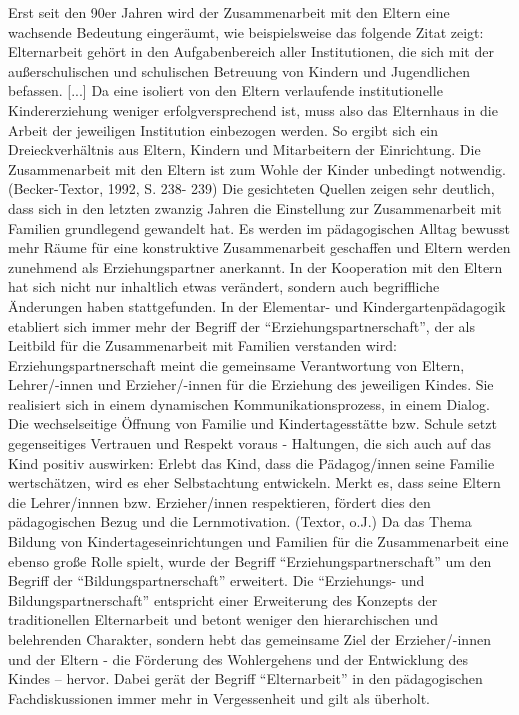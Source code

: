\documentclass[12pt,a4paper]{article}
\begin{document}
	Erst seit den 90er Jahren wird der Zusammenarbeit mit den Eltern eine wachsende Bedeutung eingeräumt, wie beispielsweise das folgende Zitat zeigt:
	Elternarbeit gehört in den Aufgabenbereich aller Institutionen, die 	sich mit der	außerschulischen und schulischen Betreuung von 		Kindern und Jugendlichen  befassen. [...] Da eine isoliert von den 	Eltern verlaufende institutionelle Kindererziehung weniger 	erfolgversprechend ist, muss also das Elternhaus in die Arbeit 	der jeweiligen Institution einbezogen werden. So ergibt sich ein 	Dreieckverhältnis aus Eltern, Kindern und Mitarbeitern der 	Einrichtung. Die Zusammenarbeit mit den Eltern ist zum Wohle 	der Kinder unbedingt notwendig. (Becker-Textor, 1992, S. 238-	239)
Die gesichteten Quellen zeigen sehr deutlich, dass sich in den letzten zwanzig Jahren die Einstellung zur Zusammenarbeit mit Familien grundlegend gewandelt hat. Es werden im pädagogischen Alltag bewusst mehr Räume für eine konstruktive Zusammenarbeit geschaffen und Eltern werden zunehmend als Erziehungspartner anerkannt. In der Kooperation mit den Eltern hat sich nicht nur inhaltlich etwas verändert, sondern auch begriffliche Änderungen haben stattgefunden. In der Elementar- und Kindergartenpädagogik etabliert sich immer mehr der Begriff der "`Erziehungspartnerschaft"', der als Leitbild für die Zusammenarbeit mit Familien verstanden wird:
Erziehungspartnerschaft meint die gemeinsame Verantwortung von Eltern, Lehrer/-innen und Erzieher/-innen für die Erziehung des jeweiligen Kindes. Sie realisiert sich in einem dynamischen Kommunikationsprozess, in einem Dialog. Die wechselseitige Öffnung von Familie und Kindertagesstätte bzw. Schule setzt gegenseitiges Vertrauen und Respekt voraus - Haltungen, die sich auch auf das Kind positiv auswirken: Erlebt das Kind, dass die Pädagog/innen seine Familie wertschätzen, wird es eher Selbstachtung entwickeln. Merkt es, dass seine Eltern die Lehrer/innnen bzw. Erzieher/innen respektieren, fördert dies den pädagogischen Bezug und die Lernmotivation. (Textor, o.J.) 	
	Da das Thema Bildung von Kindertageseinrichtungen und Familien für die Zusammenarbeit eine ebenso große Rolle spielt, wurde der Begriff "`Erziehungspartnerschaft"' um den Begriff der "`Bildungspartnerschaft"' erweitert. Die "`Erziehungs- und Bildungspartnerschaft"' entspricht einer Erweiterung des Konzepts der traditionellen Elternarbeit und betont weniger den hierarchischen und belehrenden Charakter, sondern hebt das gemeinsame Ziel  der Erzieher/-innen und der Eltern - die Förderung des Wohlergehens und der Entwicklung des Kindes – hervor. Dabei gerät der Begriff "`Elternarbeit"' in den pädagogischen Fachdiskussionen immer mehr in Vergessenheit und gilt als überholt. 
\end{document}
